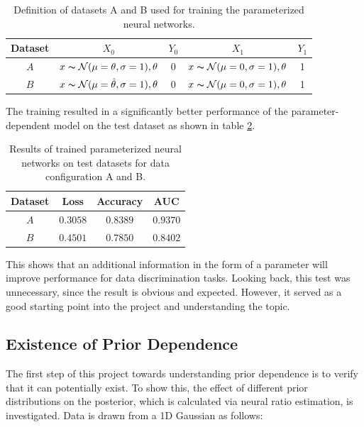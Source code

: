 \documentclass{article}
\begin{document}
\begin{table}[ht]
\centering
\begin{tabular}{|c|c|c|c|c|}
\hline
\textbf{Dataset} & $X_0$ & $Y_0$ & $X_1$ & $Y_1$ \\
\hline
$A$ & $x\thicksim\mathcal{N}(\mu=\theta, \sigma=1), \theta$ & ${0}$ & $x\thicksim\mathcal{N}(\mu=0, \sigma=1), \theta$ & {1} \\
\hline
$B$ & $x\thicksim\mathcal{N}(\mu=\hat\theta, \sigma=1), \theta$ & ${0}$ & $x\thicksim\mathcal{N}(\mu=0, \sigma=1), \theta$ & {1} \\
\hline
\end{tabular}
\caption{Definition of datasets A and B used for training the parameterized neural networks.}
\label{tab:datasets1}
\end{table}

The training resulted in a significantly better performance of the parameter-dependent model on the test dataset as shown in table \ref{tab:results1}.

\begin{table}[ht]
\centering
\begin{tabular}{|c|c|c|c|}
\hline
\textbf{Dataset} & \textbf{Loss} & \textbf{Accuracy} & \textbf{AUC} \\
\hline
$A$ & $0.3058$ & $0.8389$ & $0.9370$ \\
\hline
$B$ & $0.4501$ & $0.7850$ & $0.8402$ \\
\hline
\end{tabular}
\caption{Results of trained parameterized neural networks on test datasets for data configuration A and B.}
\label{tab:results1}
\end{table}

This shows that an additional information in the form of a parameter will improve performance for data discrimination tasks.
Looking back, this test was unnecessary, since the result is obvious and expected. However, it served as a good starting point into the project and understanding the topic. 


\subsection{Existence of Prior Dependence}

The first step of this project towards understanding prior dependence is to verify that it can potentially exist.
To show this, the effect of different prior distributions on the posterior, which is calculated via neural ratio estimation, is investigated.
Data is drawn from a 1D Gaussian as follows:
\end{document}
